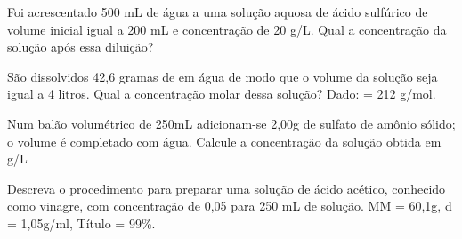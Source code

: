 \documentclass[11pt]{article}
\begin{document}
\begin{exercise}
Foi acrescentado 500 mL de água a uma solução aquosa de ácido sulfúrico de volume inicial igual a 200 mL e concentração de 20 g/L. Qual a concentração da solução após essa diluição?
\end{exercise}




\begin{exercise}
São dissolvidos 42,6 gramas de  em água de modo que o volume da solução seja igual a 4 litros. Qual a concentração molar dessa solução? Dado:  = 212 g/mol.
\end{exercise}



\begin{exercise}
Num balão volumétrico de 250mL adicionam-se 2,00g de sulfato de amônio sólido; o volume é completado com água. Calcule a concentração da solução obtida em g/L
\end{exercise}




\begin{exercise}
Descreva o procedimento para preparar uma solução de ácido acético, conhecido como vinagre,  com concentração de 0,05 para 250 mL de solução. MM = 60,1g, d = 1,05g/ml, Título = 99\%.
\end{exercise}









\end{document}
